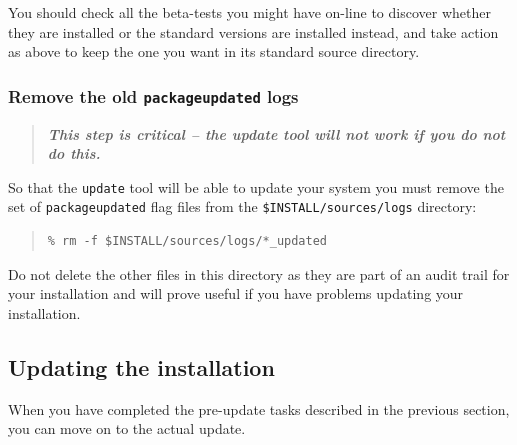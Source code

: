\documentclass[twoside,11pt]{article}
\newcommand{\xlabel}[1]{}
\renewcommand{\_}{\texttt{\symbol{95}}}
\begin{document}
You should check all the beta-tests you might have on-line to discover
whether they are installed or the standard versions are installed instead,
and take action as above to keep the one you want in its standard
source directory.

\subsubsection{Remove the old \texttt{package\_updated} logs}

\begin{quote}
\textbf{\textit{This step is critical -- the update tool will not work if you
do not do this.}}
\end{quote}

So that the \texttt{update} tool will be able to update your system you
must remove the set of \texttt{package\_updated} flag files from the
\texttt{\$INSTALL/sources/logs} directory:

\begin{quote}
\begin{verbatim}
% rm -f $INSTALL/sources/logs/*_updated
\end{verbatim}
\end{quote}

Do not delete the other files in this directory as they are part of an
audit trail for your installation and will prove useful if you have
problems updating your installation.

%
%
%

\subsection{\xlabel{updating_the_installation}Updating the installation}
\label{updating_the_installation}

When you have completed the pre-update tasks described in the previous
section, you can move on to the actual update.  
\end{document}
